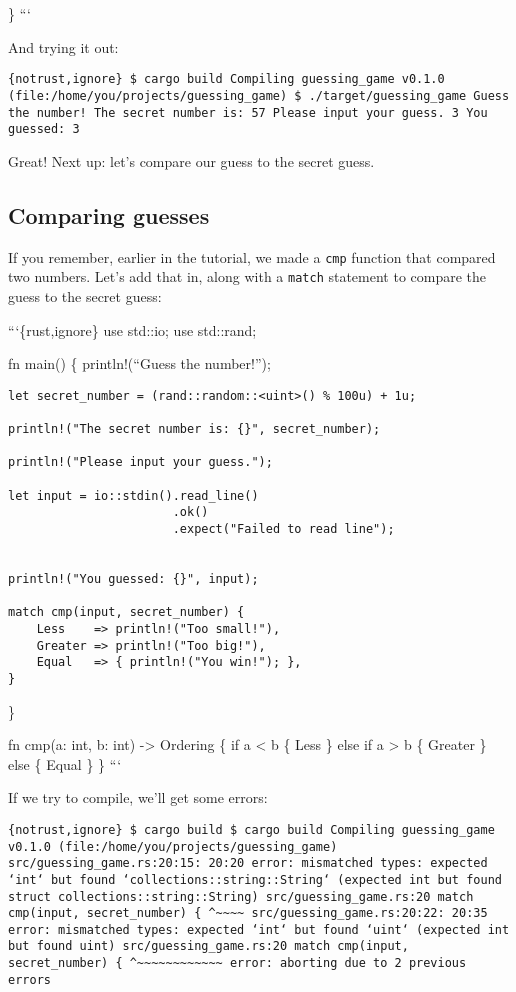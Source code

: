 \documentclass[]{article}
\begin{document}
\} ```

And trying it out:

\texttt{\{notrust,ignore\} \$ cargo build    Compiling guessing\_game v0.1.0 (file:/home/you/projects/guessing\_game) \$ ./target/guessing\_game  Guess the number! The secret number is: 57 Please input your guess. 3 You guessed: 3}

Great! Next up: let's compare our guess to the secret guess.

\subsection{Comparing guesses}\label{comparing-guesses}

If you remember, earlier in the tutorial, we made a \texttt{cmp}
function that compared two numbers. Let's add that in, along with a
\texttt{match} statement to compare the guess to the secret guess:

```\{rust,ignore\} use std::io; use std::rand;

fn main() \{ println!(``Guess the number!'');

\begin{verbatim}
let secret_number = (rand::random::<uint>() % 100u) + 1u;

println!("The secret number is: {}", secret_number);

println!("Please input your guess.");

let input = io::stdin().read_line()
                       .ok()
                       .expect("Failed to read line");


println!("You guessed: {}", input);

match cmp(input, secret_number) { 
    Less    => println!("Too small!"),
    Greater => println!("Too big!"),
    Equal   => { println!("You win!"); },
}
\end{verbatim}

\}

fn cmp(a: int, b: int) -\textgreater{} Ordering \{ if a \textless{} b \{
Less \} else if a \textgreater{} b \{ Greater \} else \{ Equal \} \} ```

If we try to compile, we'll get some errors:

\texttt{\{notrust,ignore\} \$ cargo build \$ cargo build    Compiling guessing\_game v0.1.0 (file:/home/you/projects/guessing\_game) src/guessing\_game.rs:20:15: 20:20 error: mismatched types: expected `int` but found `collections::string::String` (expected int but found struct collections::string::String) src/guessing\_game.rs:20     match cmp(input, secret\_number) \{                                       \^{}\textasciitilde{}\textasciitilde{}\textasciitilde{}\textasciitilde{} src/guessing\_game.rs:20:22: 20:35 error: mismatched types: expected `int` but found `uint` (expected int but found uint) src/guessing\_game.rs:20     match cmp(input, secret\_number) \{                                              \^{}\textasciitilde{}\textasciitilde{}\textasciitilde{}\textasciitilde{}\textasciitilde{}\textasciitilde{}\textasciitilde{}\textasciitilde{}\textasciitilde{}\textasciitilde{}\textasciitilde{}\textasciitilde{} error: aborting due to 2 previous errors}
\end{document}
